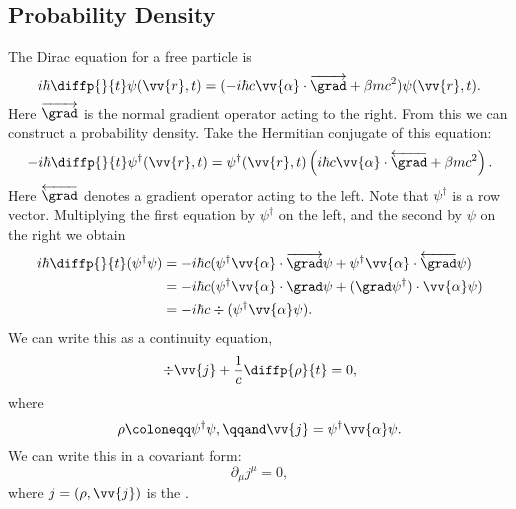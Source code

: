 \documentclass[fleqn]{NotesClass}
\newcommand{\hermit}{{\dagger}}
\begin{document}
\begin{appendices}
        \subsection{Probability Density}
        The Dirac equation for a free particle is
        \begin{equation}
            i\hbar\diffp{}{t}\psi(\vv{r}, t) = (-i\hbar c\vv{\alpha} \cdot \overrightarrow{\grad} + \beta mc^2)\psi(\vv{r}, t).
        \end{equation}
        Here \(\overrightarrow{\grad}\) is the normal gradient operator acting to the right.
        From this we can construct a probability density.
        Take the Hermitian conjugate of this equation:
        \begin{equation}
            -i\hbar\diffp{}{t}\psi^\hermit (\vv{r}, t) = \psi^\hermit(\vv{r}, t) \left( i\hbar c\vv{\alpha} \cdot \overleftarrow{\grad} + \beta mc^2 \right).
        \end{equation}
        Here \(\overleftarrow{\grad}\) denotes a gradient operator acting to the left.
        Note that \(\psi^\hermit\) is a row vector.
        Multiplying the first equation by \(\psi^\hermit\) on the left, and the second by \(\psi\) on the right we obtain
        \begin{align}
            i\hbar\diffp{}{t}(\psi^\hermit \psi) &= -i\hbar c(\psi^\hermit \vv{\alpha} \cdot \overrightarrow{\grad} \psi + \psi^\hermit \vv{\alpha} \cdot \overleftarrow{\grad}\psi)\\
            &= -i\hbar c(\psi^\hermit \vv{\alpha} \cdot \grad \psi + (\grad\psi^\hermit)\cdot \vv{\alpha}\psi)\\
            &= -i\hbar c\div(\psi^\hermit \vv{\alpha} \psi).
        \end{align}
        We can write this as a continuity equation,
        \begin{equation}
            \div\vv{j} + \frac{1}{c}\diffp{\rho}{t} = 0,
        \end{equation}
        where
        \begin{equation}
            \rho \coloneqq \psi^\hermit \psi, \qqand \vv{j} = \psi^{\hermit} \vv{\alpha} \psi.
        \end{equation}
        We can write this in a covariant form:
        \begin{equation}
            \partial_\mu j^\mu = 0,
        \end{equation}
        where \(j = (\rho, \vv{j})\) is the .
        

\end{appendices}
\end{document}
